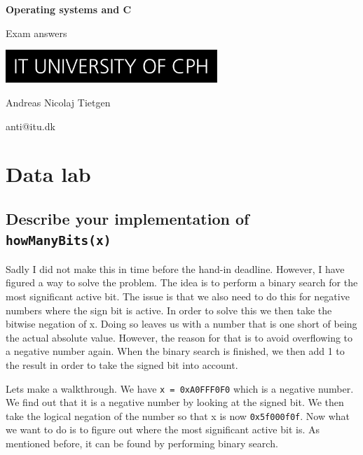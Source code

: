 \documentclass[11pt]{article}
\title{}
\author{Andreas Nicolaj Tietgen - anti@itu.dk}
\newcommand{\code}[1]{{\colorbox{lightgray!15}{\color{black}\texttt{#1}}}}
\begin{document}
\begin{titlepage}
    \begin{center}
        \huge
        \textbf{Operating systems and C}

        \vspace{0.5cm}
        Exam answers

        \vspace{3cm}
        \includegraphics[width=0.6\textwidth]{itu.jpeg}

        \vspace{3cm}
        \large
        Andreas Nicolaj Tietgen 
        
        anti@itu.dk
    \end{center}
\end{titlepage}

\newpage

\tableofcontents

\newpage
\section{Data lab}

\subsection{Describe your implementation of \code{howManyBits(x)}}
Sadly I did not make this in time before the hand-in deadline. However, I have figured a way to 
solve the problem. The idea is to perform a binary search for the most significant active bit.
The issue is that we also need to do this for negative numbers where the sign bit is active. In order to 
solve this we then take the bitwise negation of x. Doing so leaves us with a number that is one short of being the
actual absolute value. However, the reason for that is to avoid overflowing to a negative number again. 
When the binary search is finished, we then add 1 to the result in order to take the signed bit into account.

Lets make a walkthrough. We have \code{x = 0xA0FFF0F0} which is a negative number.
We find out that it is a negative number by looking at the signed bit. We then take the
logical negation of the number so that x is now \code{0x5f000f0f}. 
Now what we want to do is to figure out where the most significant active bit is. As mentioned before,
it can be found by performing binary search. 
\end{document}
